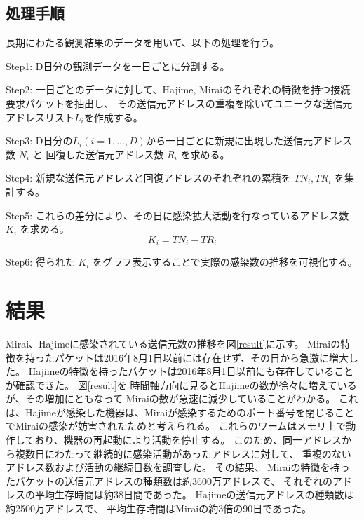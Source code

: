 \documentclass[a4j,fleqn,10pt]{jarticle}
\begin{document}
\subsection{処理手順}
長期にわたる観測結果のデータを用いて、以下の処理を行う。

%
\begin{description}
\vspace{-1.2ex}
\item{Step1:}
D日分の観測データを一日ごとに分割する。
%
\vspace{-1.2ex}
\item{Step2:}
一日ごとのデータに対して、Hajime, Miraiのそれぞれの特徴を持つ接続要求パケットを抽出し、
その送信元アドレスの重複を除いてユニークな送信元アドレスリスト$L_i$を作成する。
\vspace{-1.2ex}
%
\item{Step3:}
D日分の$L_i (i=1,...,D)$から一日ごとに新規に出現した送信元アドレス数 $N_i$ と
回復した送信元アドレス数 $R_i$ を求める。
%
\vspace{-1.2ex}
\item{Step4:}
新規な送信元アドレスと回復アドレスのそれぞれの累積を $TN_i, TR_i$ を集計する。
%
\vspace{-1.2ex}
\item{Step5:}
これらの差分により、その日に感染拡大活動を行なっているアドレス数 $K_i$ を求める。
\vspace{-1.2ex}
\begin{equation}
K_i = TN_i - TR_i
\end{equation}
%
\vspace{-1.2ex}
\item{Step6:}
得られた $K_i$ をグラフ表示することで実際の感染数の推移を可視化する。

\end{description}



\section{結果}
%
Mirai、Hajimeに感染されている送信元数の推移を図\ref{result}に示す。
%
Miraiの特徴を持ったパケットは2016年8月1日以前には存在せず、その日から急激に増大した。
Hajimeの特徴を持ったパケットは2016年8月1日以前にも存在していることが確認できた。
%
図\ref{result}を
時間軸方向に見るとHajimeの数が徐々に増えているが、その増加にともなって
Miraiの数が急速に減少していることがわかる。
%
これは、Hajimeが感染した機器は、Miraiが感染するためのポート番号を閉じることでMiraiの感染が妨害されたためと考えられる。
%
これらのワームはメモリ上で動作しており、機器の再起動により活動を停止する。
このため、同一アドレスから複数日にわたって継続的に感染活動があったアドレスに対して、
重複のないアドレス数および活動の継続日数を調査した。
その結果、
Miraiの特徴を持ったパケットの送信元アドレスの種類数は約3600万アドレスで、
それぞれのアドレスの平均生存時間は約38日間であった。
%
Hajimeの送信元アドレスの種類数は約2500万アドレスで、
平均生存時間はMiraiの約3倍の90日であった。
%
\end{document}
